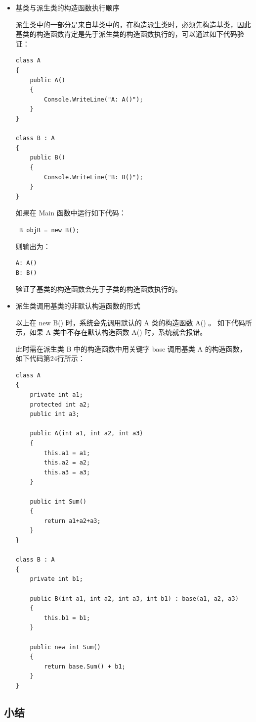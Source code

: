 \begin{itemize}
\item {基类与派生类的构造函数执行顺序}

派生类中的一部分是来自基类中的，在构造派生类时，必须先构造基类，因此基类的构造函数肯定是先于派生类的构造函数执行的，可以通过如下代码验证：

\begin{lstlisting}
class A 
{	
	public A()
	{
		Console.WriteLine("A: A()");
	}
}

class B : A
{
	public B()
	{
		Console.WriteLine("B: B()");
	}
}
\end{lstlisting}

如果在 Main 函数中运行如下代码：

\verb| B objB = new B(); |

则输出为：

\begin{verbatim}
A: A() 
B: B()
\end{verbatim}

验证了基类的构造函数会先于子类的构造函数执行的。



\item{派生类调用基类的非默认构造函数的形式}

以上在 new B() 时，系统会先调用默认的 A 类的构造函数 A() 。 如下代码所示，如果 A 类中不存在默认构造函数 A() 时，系统就会报错。

此时需在派生类 B 中的构造函数中用关键字 base 调用基类 A 的构造函数， 如下代码第24行所示：

\begin{lstlisting}
class A 
{
	private int a1;
	protected int a2;
	public int a3;	

	public A(int a1, int a2, int a3)
	{
		this.a1 = a1;
		this.a2 = a2;
		this.a3 = a3;
	}
	
	public int Sum()
	{
		return a1+a2+a3;
	}
}

class B : A
{
	private int b1;
	
	public B(int a1, int a2, int a3, int b1) : base(a1, a2, a3)
	{
		this.b1 = b1;
	}
	
	public new int Sum()
	{
		return base.Sum() + b1; 
	}
}
\end{lstlisting}

\end{itemize}



 
\subsection{小结}

